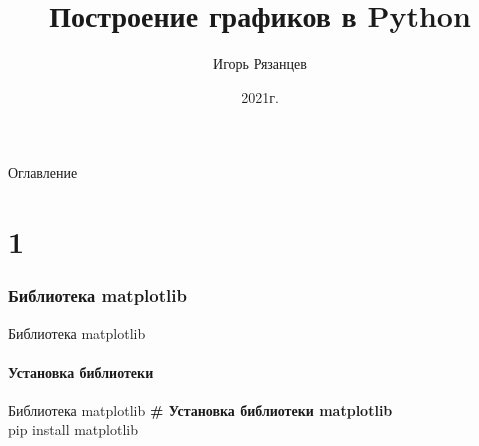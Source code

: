 \documentclass[12pt]{beamer}
\author{Игорь Рязанцев}
\title{Построение графиков в Python}
\institute{Лекция 04}
\date{2021г.}
\begin{document}
\begin{frame}
\titlepage
\end{frame}

\begin{frame}[t]{Оглавление}
\tableofcontents[part=1]
\end{frame}



\part{1}

\section{Библиотека matplotlib}
\begin{frame}{Библиотека matplotlib}
 \\
\vspace{0.3cm}
\href{https://matplotlib.org/}{}
\end{frame}

\subsection{Установка библиотеки}
\begin{frame}{Библиотека matplotlib}
\textbf{\# Установка библиотеки matplotlib} \\
\vspace{0.5cm}
pip install matplotlib
\end{frame}
\end{document}
